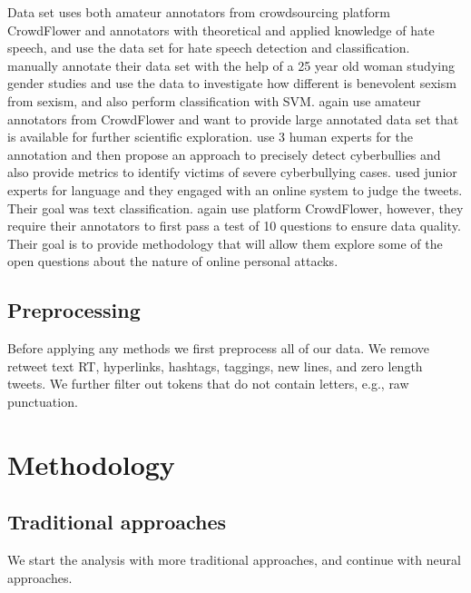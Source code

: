 \documentclass[fleqn,moreauthors,10pt]{ds_report}
\begin{document}
Data set \cite{waseem2016you} uses both amateur annotators from crowdsourcing platform CrowdFlower and annotators with theoretical and applied knowledge of hate speech, and use the data set for hate speech detection and classification. \cite{jha2017does} manually annotate their data set with the help of a 25 year old woman studying gender studies and use the data to investigate how different is benevolent sexism from sexism, and also perform classification with SVM. \cite{founta2018large} again use amateur annotators from CrowdFlower and want to provide large annotated data set that is available for further scientific exploration. \cite{bretschneider2016detecting} use 3 human experts for the annotation and then propose an approach to precisely detect cyberbullies and also provide metrics to identify victims of severe cyberbullying cases. \cite{mandl2019overview} used junior experts for language and they engaged with an online system to judge the tweets. Their goal was text classification. \cite{dixon2017ex} again use platform CrowdFlower, however, they require their annotators to first pass a test of 10 questions to ensure data quality. Their goal is to provide methodology that will allow them explore some of the open questions about the nature of online personal attacks.

\subsection{Preprocessing}
Before applying any methods we first preprocess all of our data. We remove retweet text RT, hyperlinks, hashtags, taggings, new lines, and zero length tweets. We further filter out tokens that do not contain letters, e.g., raw punctuation.

\section{Methodology}
\label{sec:metho}

\subsection{Traditional approaches}
We start the analysis with more traditional approaches, and continue with neural approaches.

\end{document}
